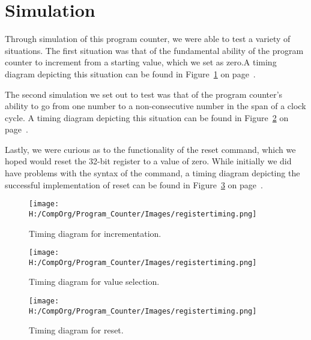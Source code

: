 \documentclass{article}
\newcommand{\Verilog}[3]{
  \lstset{language=Verilog}
  \lstset{backgroundcolor=\color{listinggray},rulecolor=\color{blue}}
  \lstset{linewidth=\textwidth}
  \lstset{commentstyle=\textit, stringstyle=\upshape,showspaces=false}
  \lstset{frame=tb}
  
}
\begin{document}

\section{Simulation}
Through simulation of this program counter, we were able to test a variety of situations. The first situation was that of the fundamental ability of the program counter to increment from a starting value, which we set as zero.A timing diagram depicting this situation can be found in Figure~\ref{fig:regtesti} on page~\pageref{fig:regtesti}.

The second simulation we set out to test was that of the program counter's ability to go from one number to a non-consecutive number in the span of a clock cycle. A timing diagram depicting this situation can be found in Figure~\ref{fig:regtestv} on page~\pageref{fig:regtestv}.

Lastly, we were curious as to the functionality of the reset command, which we hoped would reset the 32-bit register to a value of zero. While initially we did have problems with the syntax of the command, a timing diagram depicting the successful implementation of reset can be found in Figure~\ref{fig:regtestr} on page~\pageref{fig:regtestr}. 

\begin{figure}
\begin{center}
\caption{Timing diagram for incrementation.}\label{fig:regtesti}
\texttt{[image: H:/CompOrg/Program\_Counter/Images/registertiming.png]}
\end{center}
\end{figure}

\begin{figure}
	\begin{center}
		\caption{Timing diagram for value selection.}\label{fig:regtestv}
		\texttt{[image: H:/CompOrg/Program\_Counter/Images/registertiming.png]}
	\end{center}
\end{figure}

\begin{figure}
	\begin{center}
		\caption{Timing diagram for reset.}\label{fig:regtestr}
		\texttt{[image: H:/CompOrg/Program\_Counter/Images/registertiming.png]}
	\end{center}
\end{figure}
\end{document}

